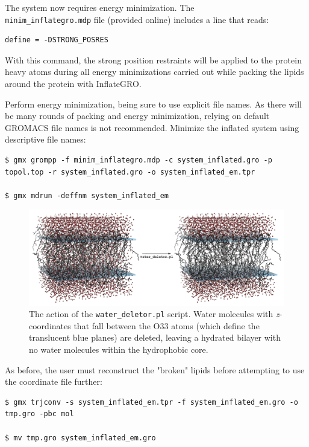 \documentclass[9pt,tutorial,pubversion]{livecoms}
\begin{document}
The system now requires energy minimization. The\\ \texttt{minim\_inflategro.mdp} file (provided online) includes a line that reads:

\begin{lstlisting}
define = -DSTRONG_POSRES
\end{lstlisting}

With this command, the strong position restraints will be applied to the protein heavy atoms during all energy minimizations carried out while packing the lipids around the protein with InflateGRO.

Perform energy minimization, being sure to use explicit file names. As there will be many rounds of packing and energy minimization, relying on default GROMACS file names is not recommended. Minimize the inflated system using descriptive file names:

\begin{lstlisting}
$ gmx grompp -f minim_inflategro.mdp -c system_inflated.gro -p topol.top -r system_inflated.gro -o system_inflated_em.tpr

$ gmx mdrun -deffnm system_inflated_em
\end{lstlisting}

\begin{figure}[h!]
\centering
\includegraphics{kalp_dppc_water_deletor}
\caption{The action of the \texttt{water\_deletor.pl} script. Water molecules with {\em z}-coordinates that fall between the O33 atoms (which define the translucent blue planes) are deleted, leaving a hydrated bilayer with no water molecules within the hydrophobic core.}
\label{kalp_lipid_water_delete}
\end{figure}

As before, the user must reconstruct the "broken" lipids before attempting to use the coordinate file further:

\begin{lstlisting}
$ gmx trjconv -s system_inflated_em.tpr -f system_inflated_em.gro -o tmp.gro -pbc mol

$ mv tmp.gro system_inflated_em.gro
\end{lstlisting}
\end{document}
